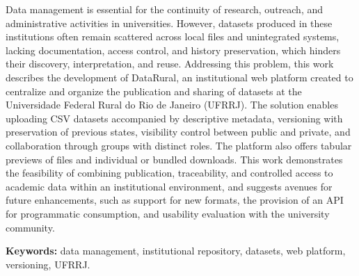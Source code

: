 Data management is essential for the continuity of research, outreach, and administrative activities in universities. However, datasets produced in these institutions often remain scattered across local files and unintegrated systems, lacking documentation, access control, and history preservation, which hinders their discovery, interpretation, and reuse. Addressing this problem, this work describes the development of DataRural, an institutional web platform created to centralize and organize the publication and sharing of datasets at the Universidade Federal Rural do Rio de Janeiro (UFRRJ). The solution enables uploading CSV datasets accompanied by descriptive metadata, versioning with preservation of previous states, visibility control between public and private, and collaboration through groups with distinct roles. The platform also offers tabular previews of files and individual or bundled downloads. This work demonstrates the feasibility of combining publication, traceability, and controlled access to academic data within an institutional environment, and suggests avenues for future enhancements, such as support for new formats, the provision of an API for programmatic consumption, and usability evaluation with the university community.

\vspace{0.5cm}
\noindent\textbf{Keywords:} data management, institutional repository, datasets, web platform, versioning, UFRRJ.
